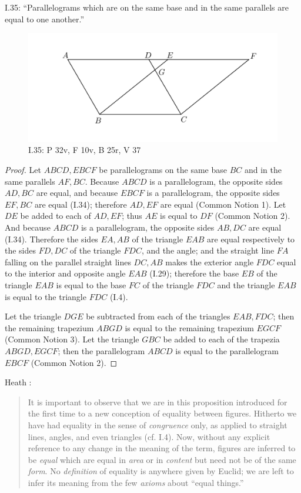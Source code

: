 \documentclass{article}
\begin{document}
I.35: ``Parallelograms which are on the same base and in the 
same parallels are equal to one another.''

\begin{figure}
\begin{center}
\includegraphics{I35.png}
\end{center}
\caption{I.35: P 32v, F 10v, B 25r, V 37}
\label{I35}
\end{figure}

\begin{proof}
Let $ABCD, EBCF$ be parallelograms on the same base $BC$ and in the same parallels
$AF,BC$. Because $ABCD$ is a parallelogram, the opposite sides $AD,BC$ are equal,
and because
$EBCF$ is a parallelogram, the opposite sides $EF,BC$ are equal (I.34); therefore $AD,EF$ are equal (Common Notion 1).
Let $DE$ be added to each of $AD,EF$; thus $AE$ is equal to $DF$ (Common Notion 2).
And because $ABCD$ is a parallelogram, the opposite sides $AB,DC$ are equal (I.34). 
Therefore the sides $EA,AB$ of the triangle $EAB$ are equal respectively 
to the sides $FD,DC$ of the triangle $FDC$, and the angle; 
and the straight line $FA$ falling on the parallel straight lines 
$DC,AB$ makes the exterior angle $FDC$ equal to the interior and opposite
angle $EAB$ (I.29); therefore the base $EB$ of the triangle $EAB$ is equal to the base
$FC$ of the triangle $FDC$ and the triangle $EAB$ is equal to the triangle $FDC$ (I.4).

Let the triangle $DGE$ be subtracted from each of the triangles $EAB,FDC$; then
the remaining trapezium $ABGD$ is equal to the remaining trapezium $EGCF$ (Common Notion 3).
Let the triangle $GBC$ be added to each of the trapezia $ABGD,EGCF$; then
the  parallelogram $ABCD$ is equal to the parallelogram $EBCF$ (Common Notion 2).
\end{proof}

Heath \cite[p.~327]{euclidI}:

\begin{quote}
It is important to observe that we are in this proposition introduced for
the first time to a new conception of equality between figures. Hitherto we
have had equality in the sense of {\em congruence} only, as applied to straight lines,
angles, and even triangles (cf. I.4). Now, without any explicit reference to
any change in the meaning of the term, figures are inferred to be {\em equal} which
are equal in {\em area} or in {\em content} but need not be of the same {\em form}. No
{\em definition} of equality is anywhere given by Euclid; we are left to infer its
meaning from the few {\em axioms} about ``equal things.''
\end{quote}
\end{document}
